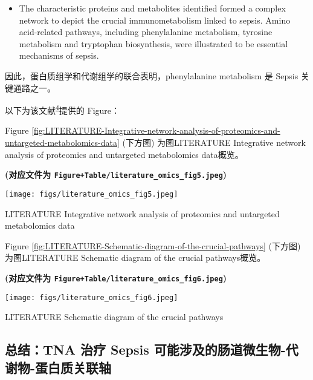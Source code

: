 \documentclass[
]{article}
\providecommand{\tightlist}{%
  \setlength{\itemsep}{0pt}\setlength{\parskip}{0pt}}
\begin{document}
\begin{itemize}
\tightlist
\item
  The characteristic proteins and metabolites identified formed a complex
  network to depict the crucial immunometabolism linked to sepsis. Amino
  acid-related pathways, including phenylalanine metabolism, tyrosine
  metabolism and tryptophan biosynthesis, were illustrated to be essential
  mechanisms of sepsis.
\end{itemize}

因此，蛋白质组学和代谢组学的联合表明，phenylalanine metabolism 是 Sepsis 关键通路之一。

以下为该文献\textsuperscript{\protect\hyperlink{ref-SerumProteomicLiang2021}{4}}提供的 Figure：

Figure \ref{fig:LITERATURE-Integrative-network-analysis-of-proteomics-and-untargeted-metabolomics-data} (下方图) 为图LITERATURE Integrative network analysis of proteomics and untargeted metabolomics data概览。

\textbf{(对应文件为 \texttt{Figure+Table/literature\_omics\_fig5.jpeg})}

\def\@captype{figure}
\begin{center}
\texttt{[image: figs/literature\_omics\_fig5.jpeg]}
\caption{LITERATURE Integrative network analysis of proteomics and untargeted metabolomics data}\label{fig:LITERATURE-Integrative-network-analysis-of-proteomics-and-untargeted-metabolomics-data}
\end{center}

Figure \ref{fig:LITERATURE-Schematic-diagram-of-the-crucial-pathways} (下方图) 为图LITERATURE Schematic diagram of the crucial pathways概览。

\textbf{(对应文件为 \texttt{Figure+Table/literature\_omics\_fig6.jpeg})}

\def\@captype{figure}
\begin{center}
\texttt{[image: figs/literature\_omics\_fig6.jpeg]}
\caption{LITERATURE Schematic diagram of the crucial pathways}\label{fig:LITERATURE-Schematic-diagram-of-the-crucial-pathways}
\end{center}

\hypertarget{ux603bux7ed3tna-ux6cbbux7597-sepsis-ux53efux80fdux6d89ux53caux7684ux80a0ux9053ux5faeux751fux7269-ux4ee3ux8c22ux7269-ux86cbux767dux8d28ux5173ux8054ux8f74}{%
\subsection{总结：TNA 治疗 Sepsis 可能涉及的肠道微生物-代谢物-蛋白质关联轴}\label{ux603bux7ed3tna-ux6cbbux7597-sepsis-ux53efux80fdux6d89ux53caux7684ux80a0ux9053ux5faeux751fux7269-ux4ee3ux8c22ux7269-ux86cbux767dux8d28ux5173ux8054ux8f74}}
\end{document}
